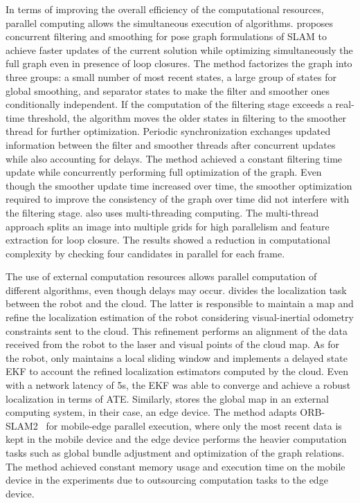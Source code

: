 In terms of improving the overall efficiency of the computational resources, parallel computing allows the simultaneous execution of algorithms.
\cite{williams-et-al:2014:0278364914531056} proposes concurrent filtering and smoothing for pose graph formulations of SLAM to achieve faster updates of the current solution while optimizing simultaneously the full graph even in presence of loop closures. The method factorizes the graph into three groups: a small number of most recent states, a large group of states for global smoothing, and separator states to make the filter and smoother ones conditionally independent. If the computation of the filtering stage exceeds a real-time threshold, the algorithm moves the older states in filtering to the smoother thread for further optimization. Periodic synchronization exchanges updated information between the filter and smoother threads after concurrent updates while also accounting for delays. The method achieved a constant filtering time update while concurrently performing full optimization of the graph. Even though the smoother update time increased over time, the smoother optimization required to improve the consistency of the graph over time did not interfere with the filtering stage.
\cite{yang-et-al:2021:12054} also uses multi-threading computing. The multi-thread approach splits an image into multiple grids for high parallelism and feature extraction for loop closure. The results showed a reduction in computational complexity by checking four candidates in parallel for each frame.

The use of external computation resources allows parallel computation of different algorithms, even though delays may occur.
\cite{ding-et-al:2019:8968550} divides the localization task between the robot and the cloud. The latter is responsible to maintain a map and refine the localization estimation of the robot considering visual-inertial odometry constraints sent to the cloud. This refinement performs an alignment of the data received from the robot to the laser and visual points of the cloud map. As for the robot, only maintains a local sliding window and implements a delayed state EKF to account the refined localization estimators computed by the cloud. Even with a network latency of 5s, the EKF was able to converge and achieve a robust localization in terms of ATE.
Similarly, \cite{ali-et-al:2020:3389033} stores the global map in an external computing system, in their case, an edge device. The method adapts ORB-SLAM2~\parencite{discussion:orb-slam2} for mobile-edge parallel execution, where only the most recent data is kept in the mobile device and the edge device performs the heavier computation tasks such as global bundle adjustment and optimization of the graph relations. The method achieved constant memory usage and execution time on the mobile device in the experiments due to outsourcing computation tasks to the edge device.



